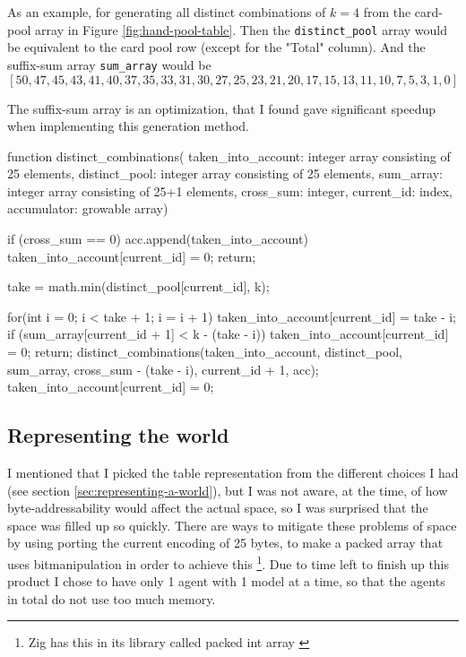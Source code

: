 As an example, for generating all distinct combinations of $k=4$ from the card-pool array in Figure \ref{fig:hand-pool-table}. Then the {\tt distinct\_pool} array would be equivalent to the card pool row (except for the "Total" column). And the suffix-sum array {\tt sum\_array} would be
\[
[50, 47, 45, 43, 41, 40, 37, 35, 33, 31, 30, 27, 25, 23, 21, 20, 17, 15, 13, 11, 10, 7, 5, 3, 1, 0]
\]

The suffix-sum array is an optimization, that I found gave significant speedup when implementing this generation method.



\begin{verbbox}
function distinct_combinations(
 taken_into_account: integer array consisting of 25 elements, 
 distinct_pool: integer array consisting of 25 elements, 
 sum_array: integer array consisting of 25+1 elements, 
 cross_sum: integer, 
 current_id: index, 
 accumulator: growable array) {
    if (cross_sum == 0) {
        acc.append(taken_into_account) 
        taken_into_account[current_id] = 0;
        return;
    }

    take = math.min(distinct_pool[current_id], k); 

    for(int i = 0; i < take + 1; i = i + 1){
            taken_into_account[current_id] = take - i;
            if (sum_array[current_id + 1] < k - (take - i)) {
		taken_into_account[current_id] = 0;
                return;
            }
            distinct_combinations(taken_into_account, 
	     distinct_pool, 
	     sum_array, 
	     cross_sum - (take - i), 
	     current_id + 1, acc);
     }
     taken_into_account[current_id] = 0;
}
\end{verbbox}
{\centering
\fbox{\theverbbox}
\par
\label{code:distinct-combinations}
}



\subsection{Representing the world}
I mentioned that I picked the table representation from the different choices I had (see section \ref{sec:representing-a-world}), but I was not aware, at the time, of how byte-addressability would affect the actual space, so I was surprised that the space was filled up so quickly. There are ways to mitigate these problems of space by using porting the current encoding of 25 bytes, to make a packed array that uses bitmanipulation in order to achieve this \footnote{Zig has this in its library called packed int array \cite{zigpackedintarr}}. Due to time left to finish up this product I chose to have only 1 agent with 1 model at a time, so that the agents in total do not use too much memory.

